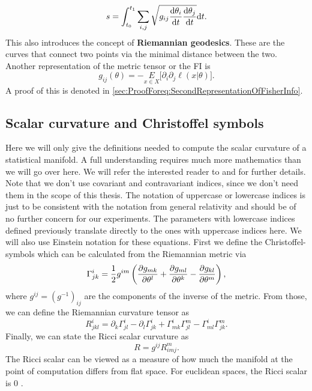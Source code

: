 \begin{equation}
	s = \int_{t_0}^{t_1} \sum_{i,j} \sqrt{g_{ij}\frac{\mathrm{d}\theta_i}{\mathrm{d}t}\frac{\mathrm{d}\theta_j}{\mathrm{d}t}} \mathrm{d}t. 
\end{equation}
This also introduces the concept of \textbf{Riemannian geodesics}. These are the curves that connect two points via the minimal distance between the two.\\
Another representation of the metric tensor or the FI is 
\begin{equation}\label{eq:SecondRepresentationOfFisherInfo}
	g_{ij}(\theta) = - \underset{x\in X}{E} \Big[ \partial_i \partial_j \ell(x|\theta) \Big].
\end{equation}
A proof of this is denoted in \cref{sec:ProofForeq:SecondRepresentationOfFisherInfo}.

\subsection{Scalar curvature and Christoffel symbols}\label{sec:Curvature}
Here we will only give the definitions needed to compute the scalar curvature of a statistical manifold. A full understanding requires much more mathematics than we will go over here. We will refer the interested reader to \cite{AmarisLectureNotes} and \cite{GeneralRelativityBook} for further details.\\
Note that we don't use covariant and contravariant indices, since we don't need them in the scope of this thesis. The notation of uppercase or lowercase indices is just to be consistent with the notation from general relativity and should be of no further concern for our experiments. The parameters with lowercase indices defined previously translate directly to the ones with uppercase indices here. We will also use Einstein notation for these equations. First we define the Christoffel-symbols which can be calculated from the Riemannian metric via \cite{GeneralRelativityBook}
\begin{equation}
	\Gamma^{i}_{jk} = \frac{1}{2}g^{im} \left(\frac{\partial g_{mk}}{\partial\theta^l} + \frac{\partial g_{ml}}{\partial\theta^k} - \frac{\partial g_{kl}}{\partial\theta^m}\right),
\end{equation} 
where $g^{ij} = (g^{-1})_{ij}$ are the components of the inverse of the metric.
From those, we can define the Riemannian curvature tensor as \cite{GeneralRelativityBook}
\begin{equation}
	R^{i}_{jkl} = \partial_k \Gamma^i_{jl} - \partial_l \Gamma^i_{jk} + \Gamma^i_{mk}\Gamma^m_{jl} - \Gamma^i_{ml}\Gamma^m_{jk}.
\end{equation}
Finally, we can state the Ricci scalar curvature as \cite{GeneralRelativityBook}
\begin{equation}
	R = g^{ij} R^m_{imj}.
\end{equation}
The Ricci scalar can be viewed as a measure of how much the manifold at the point of computation differs from flat space. For euclidean spaces, the Ricci scalar is 0 \cite{GeneralRelativityBook}.

